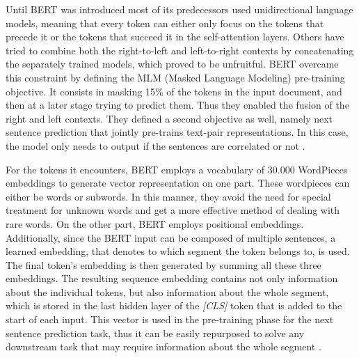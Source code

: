 Until BERT was introduced most of its predecessors used unidirectional language models, meaning that every token can either only focus on the tokens that precede it or the tokens that succeed it in the self-attention layers. Others have tried to combine both the right-to-left and left-to-right contexts by concatenating the separately trained models, which proved to be unfruitful. \cite{BERT} \newline
BERT overcame this constraint by defining the MLM (Masked Language Modeling) pre-training objective. It consists in masking 15\% of the tokens in the input document, and then at a later stage trying to predict them. Thus they enabled the fusion of the right and left contexts. They defined a second objective as well, namely next sentence prediction that jointly pre-trains text-pair representations. In this case, the model only needs to output if the sentences are correlated or not \cite{BERT}.\newline

For the tokens it encounters, BERT employs a vocabulary of 30.000 WordPieces embeddings \cite{BERTref}  to generate vector representation on one part. These wordpieces can either be words or subwords. In this manner, they avoid the need for special treatment for unknown words and get a more effective method of dealing with rare words.\newline
On the other part, BERT employs positional embeddings. Additionally, since the BERT input can be composed of multiple sentences, a learned embedding, that denotes to which segment the token belongs to, is used.\newline
The final token's embedding is then generated by summing all these three embeddings.\newline
The resulting sequence embedding contains not only information about the individual tokens, but also information about the whole segment, which is stored in the last hidden layer of the \textit{[CLS]} token that is added to the start of each input. This vector is used in the pre-training phase for the next sentence prediction task, thus it can be easily repurposed to solve any downstream task that may require information about the whole segment \cite{BERT}.

